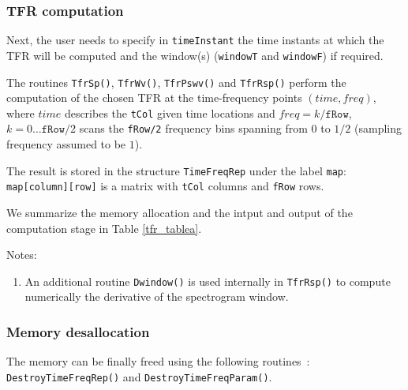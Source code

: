 \documentclass{article}
\begin{document}
\subsubsection{TFR computation}
Next, the user needs to specify in \texttt{timeInstant} the time
instants at which the TFR will be computed and the window(s)
(\texttt{windowT} and \texttt{windowF}) if required.

The routines \texttt{TfrSp()}, \texttt{TfrWv()}, \texttt{TfrPswv()}
and \texttt{TfrRsp()} perform the computation of the chosen TFR at the
time-frequency points $(time,freq)$, where $time$ describes the
\texttt{tCol} given time locations and $freq=k/\mathtt{fRow}$, $k = 0
\ldots\mathtt{fRow}/2$ scans the \texttt{fRow/2} frequency bins
spanning from $0$ to $1/2$ (sampling frequency assumed to be $1$).

The result is stored in the structure \texttt{TimeFreqRep} under the
label \texttt{map}: \texttt{map[column][row]} is a matrix with
\texttt{tCol} columns and \texttt{fRow} rows.

We summarize the memory allocation and the intput and output of the
computation stage in Table \ref{tfr_tablea}.

\vspace{3mm}
Notes:
\begin{enumerate}
\item An additional routine \texttt{Dwindow()} is used internally in
\texttt{TfrRsp()} to compute numerically the derivative of the
spectrogram window.
\end{enumerate}

\subsubsection{Memory desallocation}
The memory can be finally freed using the following routines~:
\texttt{DestroyTimeFreqRep()} and \texttt{DestroyTimeFreqParam()}.
\end{document}
